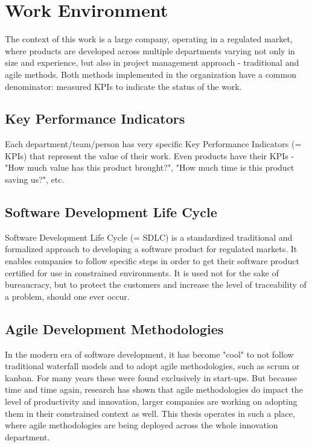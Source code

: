 \newpage

\section{Work Environment}

The context of this work is a large company, operating in a regulated market, where products are developed across multiple departments varying not only in size and experience, but also in project management approach - traditional and agile methods. Both methods implemented in the organization have a common denominator: measured KPIs to indicate the status of the work.

\subsection{Key Performance Indicators}

Each department/team/person has very specific Key Performance Indicators (= KPIs) \cite{weber2005key} that represent the value of their work. Even products have their KPIs - "How much value has this product brought?", "How much time is this product saving us?", etc.

\subsection{Software Development Life Cycle}

Software Development Life Cycle (= SDLC) is a standardized traditional and formalized approach to developing a software product for regulated markets. It enables companies to follow specific steps in order to get their software product certified for use in constrained environments. It is used not for the sake of bureaucracy, but to protect the customers and increase the level of traceability of a problem, should one ever occur.

\subsection{Agile Development Methodologies}

In the modern era of software development, it has become "cool" to not follow traditional waterfall models and to adopt agile methodologies, such as scrum or kanban. For many years these were found exclusively in start-ups. But because time and time again, research \cite{947100} has shown that agile methodologies do impact the level of productivity and innovation, larger companies are working on adopting them in their constrained context as well. This thesis operates in such a place, where agile methodologies are being deployed across the whole innovation department.

